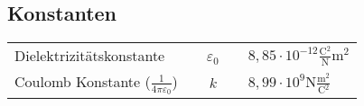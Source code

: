 \subsection{Konstanten}
\settowidth{\MyLenA}{Temperatur~~}
\begin{tabular}{lcl}
	Dielektrizitätskonstante 		& ~~$\varepsilon_0$~~ & $8,85 \cdot 10^{-12} \frac{\si{\coulomb^2}}{\si{\newton}}\si{\metre}^2$ \\
	Coulomb Konstante ($\frac{1}{4 \pi \varepsilon_0}$) & $k$ & $8,99 \cdot 10^9 \si{\newton} \frac{\si{\metre^2}}{\si{\coulomb^2}}$
\end{tabular}


